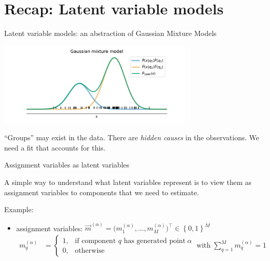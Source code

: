 \section{Recap: Latent variable models}

\begin{frame} 
    \begin{center}
    Latent variable models: an abstraction of Gaussian Mixture Models
    \end{center}
	
\end{frame}


\begin{frame}{}

\begin{center}
	\includegraphics[width=0.7\textwidth]{img/latentexample_gmm}
\end{center}

``Groups'' may exist in the data. There are \emph{hidden causes} in the observations. We need a fit that accounts for this.

\end{frame}

\begin{frame}{Assignment variables as latent variables}

A simple way to understand what latent variables represent is to view them as assignment variables to components that we need to estimate.

Example:\\

\begin{itemize} 
\item assignment variables: $\vec{m}^{(\alpha)} =  \big( m_1^{(\alpha)}, \dots, m_M^{(\alpha)} \big)^\top \in \left\{ 0, 1 \right\}^M$ \\
		\begin{align}
		m_q^{(\alpha)} &= 
		\begin{cases}
		1, & \text{if component } q \text{ has generated point}~\alpha\\
		0, & \text{otherwise}
		\end{cases}
		\;\text{with} \;
		 \sum_{q=1}^{M} m_q^{(\alpha)} = 1 
		\end{align}
\end{itemize}

\end{frame}


